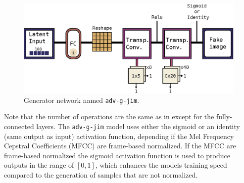 \begin{figure}[!ht]
  \centering
    \includegraphics[height=0.23\textwidth]{./4_nn/figs/nn_arch_adv_g_jim.eps}
  \caption{Generator network named \texttt{adv-g-jim}.}
  \label{fig:nn_arch_adv_g_jim}
\end{figure}
\FloatBarrier
\noindent
Note that the number of operations are the same as in  except for the fully-connected layers.
The \texttt{adv-g-jim} model uses either the sigmoid or an identity (same output as input) activation function, depending if the Mel Frequency Cepstral Coefficients (MFCC) are frame-based normalized.
If the MFCC are frame-based normalized the sigmoid activation function is used to produce outputs in the range of $[0, 1]$, which enhances the models training speed compared to the generation of samples that are not normalized.
%
%


